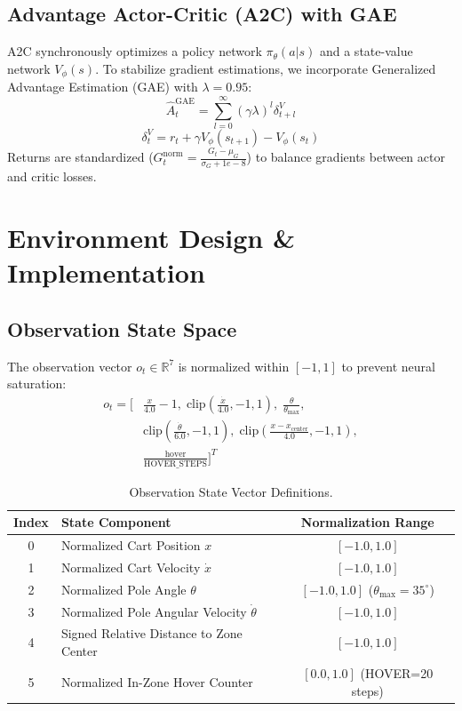\documentclass[journal,twocolumn]{IEEEtran}
\begin{document}
\subsection{Advantage Actor-Critic (A2C) with GAE}
A2C synchronously optimizes a policy network $\pi_\theta(a|s)$ and a state-value network $V_\phi(s)$. To stabilize gradient estimations, we incorporate Generalized Advantage Estimation (GAE) with $\lambda = 0.95$:
\begin{equation}
\hat{A}_t^{\text{GAE}} = \sum_{l=0}^{\infty} (\gamma \lambda)^l \delta_{t+l}^V
\end{equation}
\begin{equation}
\delta_t^V = r_t + \gamma V_\phi(s_{t+1}) - V_\phi(s_t)
\end{equation}
Returns are standardized ($G_t^{\text{norm}} = \frac{G_t - \mu_G}{\sigma_G + 1e-8}$) to balance gradients between actor and critic losses.

\section{Environment Design \& Implementation}

\subsection{Observation State Space}
The observation vector $o_t \in \mathbb{R}^7$ is normalized within $[-1, 1]$ to prevent neural saturation:
\begin{equation}
\begin{aligned}
o_t = \Big[ & \frac{x}{4.0}-1, \; \text{clip}\left(\frac{\dot{x}}{4.0}, -1, 1\right), \; \frac{\theta}{\theta_{\text{max}}}, \\
& \text{clip}\left(\frac{\dot{\theta}}{6.0}, -1, 1\right), \; \text{clip}\left(\frac{x - x_{\text{center}}}{4.0}, -1, 1\right), \\
& \frac{\text{hover}}{\text{HOVER\_STEPS}} \Big]^T
\end{aligned}
\end{equation}

\begin{table}[H]
\centering
\caption{Observation State Vector Definitions.}
\label{tab:obs_space}
\begin{tabular}{clc}
\toprule
\textbf{Index} & \textbf{State Component} & \textbf{Normalization Range} \\ 
\midrule
0 & Normalized Cart Position $x$ & $[-1.0, 1.0]$ \\
1 & Normalized Cart Velocity $\dot{x}$ & $[-1.0, 1.0]$ \\
2 & Normalized Pole Angle $\theta$ & $[-1.0, 1.0]$ ($\theta_{\text{max}} = 35^\circ$) \\
3 & Normalized Pole Angular Velocity $\dot{\theta}$ & $[-1.0, 1.0]$ \\
4 & Signed Relative Distance to Zone Center & $[-1.0, 1.0]$ \\
5 & Normalized In-Zone Hover Counter & $[0.0, 1.0]$ (HOVER=20 steps) \\
\bottomrule
\end{tabular}
\end{table}
\end{document}
